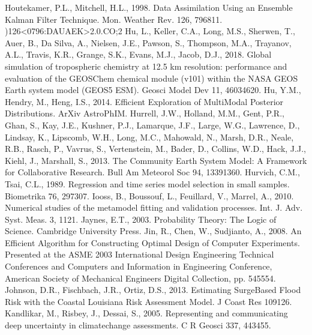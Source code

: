 \documentclass[letterpaper,10pt,english]{sphinxmanual}
\begin{document}
Houtekamer, P.L., Mitchell, H.L., 1998. Data Assimilation Using an Ensemble Kalman Filter Technique. Mon. Weather Rev. 126, 796\textendash{}811. )126\textless{}0796:DAUAEK\textgreater{}2.0.CO;2
Hu, L., Keller, C.A., Long, M.S., Sherwen, T., Auer, B., Da Silva, A., Nielsen, J.E., Pawson, S., Thompson, M.A., Trayanov, A.L., Travis, K.R., Grange, S.K., Evans, M.J., Jacob, D.J., 2018. Global simulation of tropospheric chemistry at 12.5 km resolution: performance and evaluation of the GEOS\sphinxhyphen{}Chem chemical module (v10\sphinxhyphen{}1) within the NASA GEOS Earth system model (GEOS\sphinxhyphen{}5 ESM). Geosci Model Dev 11, 4603\textendash{}4620. 
Hu, Y.\sphinxhyphen{}M., Hendry, M., Heng, I.S., 2014. Efficient Exploration of Multi\sphinxhyphen{}Modal Posterior Distributions. ArXiv Astro\sphinxhyphen{}PhIM.
Hurrell, J.W., Holland, M.M., Gent, P.R., Ghan, S., Kay, J.E., Kushner, P.J., Lamarque, J.\sphinxhyphen{}F., Large, W.G., Lawrence, D., Lindsay, K., Lipscomb, W.H., Long, M.C., Mahowald, N., Marsh, D.R., Neale, R.B., Rasch, P., Vavrus, S., Vertenstein, M., Bader, D., Collins, W.D., Hack, J.J., Kiehl, J., Marshall, S., 2013. The Community Earth System Model: A Framework for Collaborative Research. Bull Am Meteorol Soc 94, 1339\textendash{}1360. 
Hurvich, C.M., Tsai, C.\sphinxhyphen{}L., 1989. Regression and time series model selection in small samples. Biometrika 76, 297\textendash{}307.
Iooss, B., Boussouf, L., Feuillard, V., Marrel, A., 2010. Numerical studies of the metamodel fitting and validation processes. Int. J. Adv. Syst. Meas. 3, 11\textendash{}21.
Jaynes, E.T., 2003. Probability Theory: The Logic of Science. Cambridge University Press.
Jin, R., Chen, W., Sudjianto, A., 2008. An Efficient Algorithm for Constructing Optimal Design of Computer Experiments. Presented at the ASME 2003 International Design Engineering Technical Conferences and Computers and Information in Engineering Conference, American Society of Mechanical Engineers Digital Collection, pp. 545\textendash{}554. 
Johnson, D.R., Fischbach, J.R., Ortiz, D.S., 2013. Estimating Surge\sphinxhyphen{}Based Flood Risk with the Coastal Louisiana Risk Assessment Model. J Coast Res 109\textendash{}126. 
Kandlikar, M., Risbey, J., Dessai, S., 2005. Representing and communicating deep uncertainty in climate\sphinxhyphen{}change assessments. C R Geosci 337, 443\textendash{}455.
\end{document}
